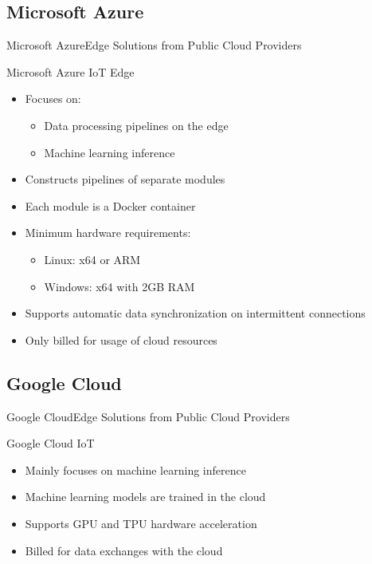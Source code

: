 \documentclass[10pt,xcolor={dvipsnames},notes]{beamer}
\renewcommand{\logofile}{example-grid-100x100pt}
\renewcommand{\logoscale}{0.0}
\begin{document}
\subsection{Microsoft Azure}
\renewcommand{\logofile}{img/azure}
\renewcommand{\logoscale}{0.9}
\begin{frame}{Microsoft Azure}{Edge Solutions from Public Cloud Providers}

\begin{block}{Microsoft Azure IoT Edge}
  \begin{itemize}
    \item Focuses on:
    \begin{itemize}
        \item Data processing pipelines on the edge
        \item Machine learning inference
    \end{itemize}
    \item Constructs pipelines of separate modules
    \item Each module is a Docker container
    \item Minimum hardware requirements:
    \begin{itemize}
        \item Linux: x64 or ARM
        \item Windows: x64 with 2GB RAM
    \end{itemize}
    \item Supports automatic data synchronization on intermittent connections
    \item Only billed for usage of cloud resources
  \end{itemize}
\end{block}
\end{frame}

\subsection{Google Cloud}
\renewcommand{\logofile}{img/gcp}
\renewcommand{\logoscale}{0.7}
\begin{frame}{Google Cloud}{Edge Solutions from Public Cloud Providers}

\begin{block}{Google Cloud IoT}
  \begin{itemize}
    \item Mainly focuses on machine learning inference
    \item Machine learning models are trained in the cloud
    \item Supports GPU and TPU hardware acceleration
    \item Billed for data exchanges with the cloud
  \end{itemize}
\end{block}
\end{frame}
     
\end{document}
